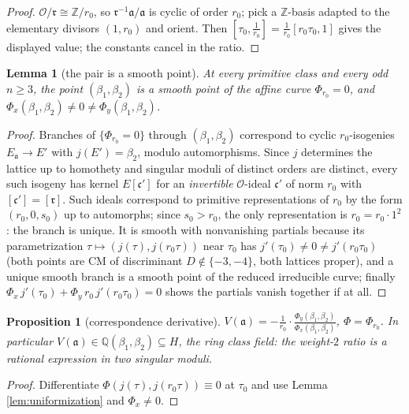 \documentclass[11pt]{amsart}
\numberwithin{equation}{section}
\theoremstyle{plain}
\newtheorem{proposition}[theorem]{Proposition}
\newtheorem{lemma}[theorem]{Lemma}
\theoremstyle{definition}
\theoremstyle{remark}
\newcommand{\Q}{\mathbb{Q}}
\newcommand{\Z}{\mathbb{Z}}
\newcommand{\ideala}{\mathfrak{a}}
\newcommand{\idealc}{\mathfrak{c}}
\newcommand{\idealr}{\mathfrak{r}}
\newcommand{\lat}[1]{\left[#1\right]}
\begin{document}
\begin{proof}
$\mathcal{O}/\idealr \cong \Z/r_0$, so $\idealr^{-1}\ideala/\ideala$
is cyclic of order $r_0$; pick a $\Z$-basis adapted to the elementary
divisors $(1, r_0)$ and orient.  Then $\lat{\tau_0, \tfrac1{r_0}} =
\tfrac1{r_0}\lat{r_0\tau_0, 1}$ gives the displayed value; the
constants cancel in the ratio.
\end{proof}

\begin{lemma}[the pair is a smooth point]\label{lem:smooth}
At every primitive class and every odd $n \ge 3$, the point
$(\beta_1, \beta_2)$ is a smooth point of the affine curve
$\Phi_{r_0} = 0$, and $\Phi_x(\beta_1, \beta_2) \ne 0 \ne
\Phi_y(\beta_1, \beta_2)$.
\end{lemma}

\begin{proof}
Branches of $\{\Phi_{r_0} = 0\}$ through $(\beta_1, \beta_2)$
correspond to cyclic $r_0$-isogenies $E_{\ideala} \to E'$ with
$j(E') = \beta_2$, modulo automorphisms.  Since $j$ determines the
lattice up to homothety and singular moduli of distinct orders are
distinct, every such isogeny has kernel $E[\idealc']$ for an
\emph{invertible} $\mathcal{O}$-ideal $\idealc'$ of norm $r_0$ with
$[\idealc'] = [\idealr]$.  Such ideals correspond to primitive
representations of $r_0$ by the form $(r_0, 0, s_0)$ up to automorphs;
since $s_0 > r_0$, the only representation is $r_0 = r_0\cdot 1^2$:
the branch is unique.  It is smooth with nonvanishing partials because
its parametrization $\tau \mapsto (j(\tau), j(r_0\tau))$ near $\tau_0$
has $j'(\tau_0) \ne 0 \ne j'(r_0\tau_0)$ (both points are CM of
discriminant $D \notin \{-3, -4\}$, both lattices proper), and a
unique smooth branch is a smooth point of the reduced irreducible
curve; finally
$\Phi_x\,j'(\tau_0) + \Phi_y\,r_0\,j'(r_0\tau_0) = 0$ shows the
partials vanish together if at all.
\end{proof}

\begin{proposition}[correspondence derivative]\label{prop:corrderiv}
$\displaystyle
V(\ideala) = -\frac{1}{r_0}\cdot\frac{\Phi_y(\beta_1,
\beta_2)}{\Phi_x(\beta_1, \beta_2)}$, $\Phi = \Phi_{r_0}$.  In
particular $V(\ideala) \in \Q(\beta_1, \beta_2) \subseteq H$, the ring
class field: the weight-$2$ ratio is a rational expression in two
singular moduli.
\end{proposition}

\begin{proof}
Differentiate $\Phi(j(\tau), j(r_0\tau)) \equiv 0$ at $\tau_0$ and use
Lemma \ref{lem:uniformization} and $\Phi_x \ne 0$.
\end{proof}
\end{document}
